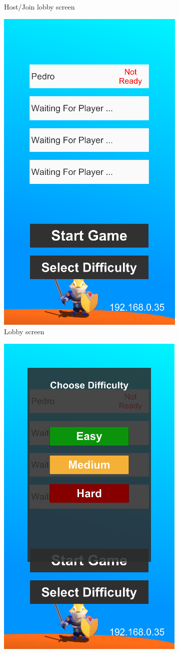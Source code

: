 \documentclass{dissertation}
\begin{document}
\begin{appendices}
\begin{figure}[H]
\begin{subfigure}[h]{.5\textwidth}
\caption{Host/Join lobby screen}
\label{fig:f2}
\end{subfigure}
\begin{subfigure}[h]{.5\textwidth}
\centering
\includegraphics[width = .6\linewidth]{images/final-ui3.png}
\caption{Lobby screen}
\label{fig:f3}
\end{subfigure}
\begin{subfigure}[h]{.5\textwidth}
\centering
\includegraphics[width = .6\linewidth]{images/final-ui4.png}

\end{subfigure}
\end{figure}
\end{appendices}
\end{document}
